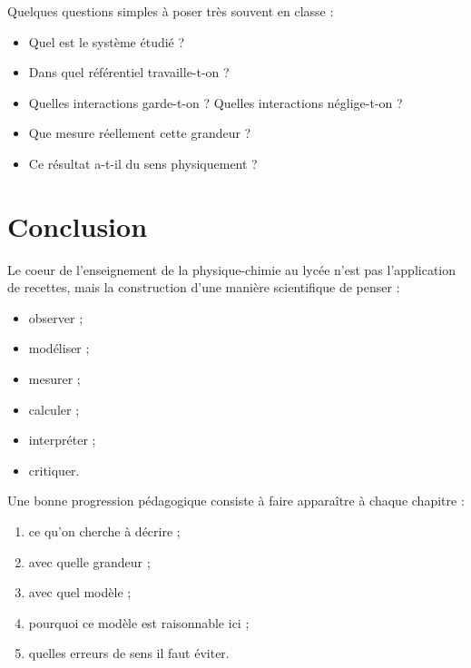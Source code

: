 \documentclass[11pt,a4paper]{article}
\begin{document}
\begin{idee}
Quelques questions simples à poser très souvent en classe :
\begin{itemize}
    \item Quel est le système étudié ?
    \item Dans quel référentiel travaille-t-on ?
    \item Quelles interactions garde-t-on ? Quelles interactions néglige-t-on ?
    \item Que mesure réellement cette grandeur ?
    \item Ce résultat a-t-il du sens physiquement ?
\end{itemize}
\end{idee}

\section{Conclusion}

\begin{bilan}
Le coeur de l'enseignement de la physique-chimie au lycée n'est pas l'application de recettes,
mais la construction d'une manière scientifique de penser :
\begin{itemize}
    \item observer ;
    \item modéliser ;
    \item mesurer ;
    \item calculer ;
    \item interpréter ;
    \item critiquer.
\end{itemize}

Une bonne progression pédagogique consiste à faire apparaître à chaque chapitre :
\begin{enumerate}
    \item ce qu'on cherche à décrire ;
    \item avec quelle grandeur ;
    \item avec quel modèle ;
    \item pourquoi ce modèle est raisonnable ici ;
    \item quelles erreurs de sens il faut éviter.
\end{enumerate}
\end{bilan}
\end{document}
